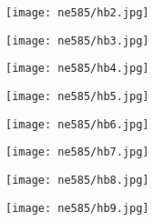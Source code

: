 \documentclass[aspectratio=1610,pdftex,dvipsnames,compress,xcolor={dvipsnames}]{beamer}
\begin{document}
\begin{frame}{}
    \begin{figure}
        \centering
        \texttt{[image: ne585/hb2.jpg]}
    \end{figure}
\end{frame}


\begin{frame}{}
    \begin{figure}
        \centering
        \texttt{[image: ne585/hb3.jpg]}
    \end{figure}
\end{frame}


\begin{frame}{}
    \begin{figure}
        \centering
        \texttt{[image: ne585/hb4.jpg]}
    \end{figure}
\end{frame}


\begin{frame}{}
    \begin{figure}
        \centering
        \texttt{[image: ne585/hb5.jpg]}
    \end{figure}
\end{frame}


\begin{frame}{}
    \begin{figure}
        \centering
        \texttt{[image: ne585/hb6.jpg]}
    \end{figure}
\end{frame}


\begin{frame}{}
    \begin{figure}
        \centering
        \texttt{[image: ne585/hb7.jpg]}
    \end{figure}
\end{frame}


\begin{frame}{}
    \begin{figure}
        \centering
        \texttt{[image: ne585/hb8.jpg]}
    \end{figure}
\end{frame}


\begin{frame}{}
    \begin{figure}
        \centering
        \texttt{[image: ne585/hb9.jpg]}
    \end{figure}
\end{frame}
\end{document}
